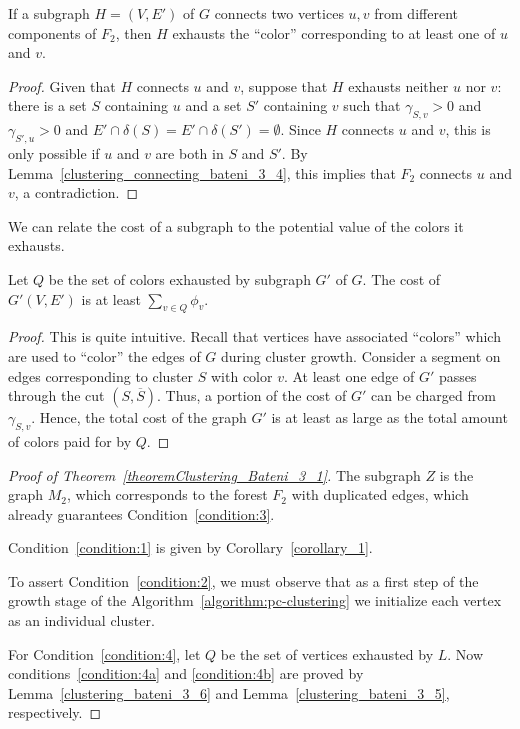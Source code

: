 \begin{lemma} \label{clustering_bateni_3_5}
    If a subgraph \(H=(V, E')\) of \(G\) connects two vertices \(u, v\) from different components of \(F_2\), then \(H\) exhausts the ``color'' corresponding to at least one of \(u\) and \(v\).
\end{lemma}
\begin{proof}
    Given that \(H\) connects \(u\) and \(v\), suppose that \(H\) exhausts neither \(u\) nor \(v\): there is a set \(S\) containing \(u\) and a set \(S'\) containing \(v\) such that \(\gamma_{S, v} > 0\) and \(\gamma_{S', u} > 0\) and \(E' \cap \delta(S) = E' \cap \delta(S') = \emptyset\). Since \(H\) connects \(u\) and \(v\), this is only possible if \(u\) and \(v\) are both in \(S\) and \(S'\). By Lemma~\ref{clustering_connecting_bateni_3_4}, this implies that \(F_2\) connects \(u\) and \(v\), a contradiction.
\end{proof}

We can relate the cost of a subgraph to the potential value of the colors it exhausts.

\begin{lemma} \label{clustering_bateni_3_6}
    Let \(Q\) be the set of colors exhausted by subgraph \(G'\) of \(G\). The cost of \(G'(V, E')\) is at least \(\sum_{v \in Q} \phi_v\).
\end{lemma}
\begin{proof}
    This is quite intuitive. Recall that vertices have associated ``colors'' which are used to ``color'' the edges of \(G\) during cluster growth. Consider a segment on edges corresponding to cluster \(S\) with color \(v\). At least one edge of \(G'\) passes through the cut \((S, \overline{S})\). Thus, a portion of the cost of \(G'\) can be charged from \(\gamma_{S, v}\). Hence, the total cost of the graph \(G'\) is at least as large as the total amount of colors paid for by \(Q\).
\end{proof}


\begin{proof}[Proof of Theorem~\ref{theoremClustering_Bateni_3_1}]
The subgraph \(Z\) is the graph \(M_2\), which corresponds to the forest \(F_2\) with duplicated edges, which already guarantees Condition~\eqref{condition:3}.

Condition~\eqref{condition:1} is given by Corollary~\ref{corollary_1}. 

To assert Condition~\eqref{condition:2}, we must observe that as a first step of the growth stage of the Algorithm~\ref{algorithm:pc-clustering} we initialize each vertex as an individual cluster.

For Condition~\eqref{condition:4}, let \(Q\) be the set of vertices exhausted by \(L\). Now conditions~\eqref{condition:4a} and \eqref{condition:4b} are proved by Lemma~\ref{clustering_bateni_3_6} and Lemma~\ref{clustering_bateni_3_5}, respectively.

\end{proof}

